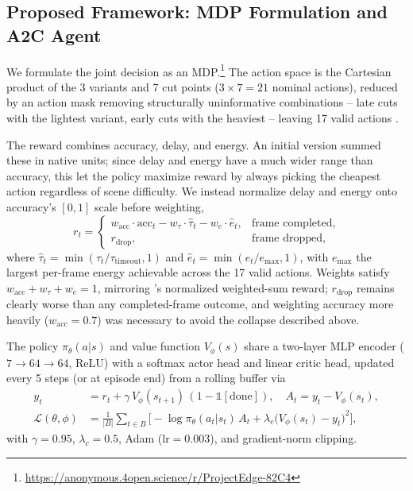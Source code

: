 \documentclass[conference]{IEEEtran}
\begin{document}
\subsection{Proposed Framework: MDP Formulation and A2C Agent}
We formulate the joint decision as an MDP.\footnote{\url{https://anonymous.4open.science/r/ProjectEdge-82C4}} The action space is the Cartesian product of the 3 variants and 7 cut points ($3\times7=21$ nominal actions), reduced by an action mask removing structurally uninformative combinations -- late cuts with the lightest variant, early cuts with the heaviest -- leaving 17 valid actions \cite{liu2026reinforcement}.

The reward combines accuracy, delay, and energy. An initial version summed these in native units; since delay and energy have a much wider range than accuracy, this let the policy maximize reward by always picking the cheapest action regardless of scene difficulty. We instead normalize delay and energy onto accuracy's $[0,1]$ scale before weighting,
\begin{equation}
r_t =
\begin{cases}
w_{\text{acc}} \cdot \text{acc}_t - w_\tau \cdot \hat{\tau}_t - w_e \cdot \hat{e}_t, & \text{frame completed}, \\
r_{\text{drop}}, & \text{frame dropped},
\end{cases} \label{eq:reward}
\end{equation}
where $\hat{\tau}_t = \min(\tau_t/\tau_{\text{timeout}}, 1)$ and $\hat{e}_t = \min(e_t/e_{\max}, 1)$, with $e_{\max}$ the largest per-frame energy achievable across the 17 valid actions. Weights satisfy $w_{\text{acc}}+w_\tau+w_e=1$, mirroring \citet{mounesan2024edgerl}'s normalized weighted-sum reward; $r_{\text{drop}}$ remains clearly worse than any completed-frame outcome, and weighting accuracy more heavily ($w_{\text{acc}}=0.7$) was necessary to avoid the collapse described above.

The policy $\pi_\theta(a|s)$ and value function $V_\phi(s)$ share a two-layer MLP encoder ($7 \rightarrow 64 \rightarrow 64$, ReLU) with a softmax actor head and linear critic head, updated every 5 steps (or at episode end) from a rolling buffer via
\begin{align}
y_t &= r_t + \gamma \, V_\phi(s_{t+1}) \, (1 - \mathbb{1}[\text{done}]), \quad A_t = y_t - V_\phi(s_t), \label{eq:tdtarget} \\
\mathcal{L}(\theta,\phi) &= \frac{1}{|B|}\sum_{t \in B} \Big[-\log \pi_\theta(a_t|s_t)\, A_t + \lambda_c \big(V_\phi(s_t)-y_t\big)^2\Big], \label{eq:loss}
\end{align}
with $\gamma = 0.95$, $\lambda_c = 0.5$, Adam ($\text{lr}=0.003$), and gradient-norm clipping.
\end{document}
